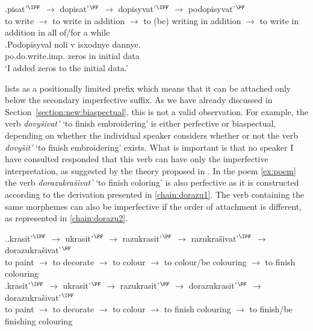 \exg.\label{chain:podo}pisat'$^{\IPF}$ $\rightarrow$ dopisat'$^{\PF}$ $\rightarrow$ dopisyvat'$^{\IPF}$ $\rightarrow$ podopisyvat'$^{\PF}$\\
{to write} $\rightarrow$ {to write in addition} $\rightarrow$ {to (be) writing in addition} $\rightarrow$ {to write in addition in all of/for a while}\\

\exg.\label{ex:podopisyval}Podopisyval noli v isxodnye dannye.\\
po.do.write.imp. zeros in initial data\\
\trans `I added zeros to the initial data.'

\citet{Tatevosov:09} lists  as a positionally limited prefix which means that it can be attached only below the secondary imperfective suffix. As we have already discussed in Section~\ref{section:new:biaspectual}, this is not a valid observation. For example, the verb \textit{dovy\v{s}ivat'} `to finish embroidering' is either perfective or biaspectual, depending on whether the individual speaker considers whether or not the verb \textit{dovy\v{s}it'} `to finish embroidering' exists. What is important is that no speaker I have consulted responded that this verb can have only the imperfective interpretation, as suggested by the theory proposed in \citealt{Tatevosov:09}. In the poem \ref{ex:poem} the verb \textit{dorazukra\v{s}ivat'} `to finish coloring' is also perfective as it is constructed according to the derivation presented in \ref{chain:dorazu1}. The verb containing the same morphemes can also be imperfective if the order of attachment is different, as represented in \ref{chain:dorazu2}.

\ex.\ag.\label{chain:dorazu1}krasit'$^{\IPF}$ $\rightarrow$ ukrasit'$^{\PF}$ $\rightarrow$ razukrasit'$^{\PF}$ $\rightarrow$ razukra\v{s}ivat'$^{\IPF}$ $\rightarrow$ dorazukra\v{s}ivat'$^{\PF}$\\
{to paint} $\rightarrow$ {to decorate} $\rightarrow$ {to colour} $\rightarrow$ {to colour/be colouring} $\rightarrow$ {to finish colouring}\\
\bg.\label{chain:dorazu2}krasit'$^{\IPF}$ $\rightarrow$ ukrasit'$^{\PF}$ $\rightarrow$ razukrasit'$^{\PF}$ $\rightarrow$ dorazukrasit'$^{\PF}$ $\rightarrow$ dorazukra\v{s}ivat'$^{\IPF}$\\
{to paint} $\rightarrow$ {to decorate} $\rightarrow$ {to colour} $\rightarrow$ {to finish colouring} $\rightarrow$ {to finish/be finishing colouring}\\

